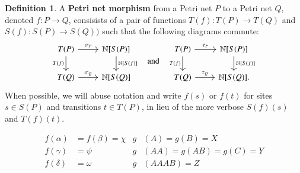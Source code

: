 \documentclass[aps,prd,onecolumn,nofootinbib,letterpaper,preprintnumbers,superscriptaddress,eqsecnum]{revtex4}
\theoremstyle{definition}
\newtheorem{definition}{Definition}
\newcommand{\N}{\mathbb{N}}
\begin{document}
\begin{definition}\label{def:petri-map}
    A \textbf{Petri net morphism} from a Petri net $P$ to a Petri net $Q$, denoted $f : P \rightarrow Q$, consisists of a pair of functions $T(f) : T(P) \rightarrow T(Q)$ and $S(f): S(P) \rightarrow S(Q))$ such that the following diagrams commute:
    \begin{equation*}
        \begin{tikzcd}
            T(P)
            \arrow[r, "\sigma_P"]
            \arrow[d, "T(f)", swap]
            &
            \N[S(P)]
            \arrow[d, "\N \lbrack S(f) \rbrack"]
            \\
            T(Q)
            \arrow[r, "\sigma_Q"]
            &
            \N[S(Q)]
        \end{tikzcd}
        \quad
        \textrm{and}
        \quad
        \begin{tikzcd}
            T(P)
            \arrow[r, "\tau_P"]
            \arrow[d, "T(f)", swap]
            &
            \N[S(P)]
            \arrow[d, "\N \lbrack S(f) \rbrack"]
            \\
            T(Q)
            \arrow[r, "\tau_Q"]
            &
            \N[S(Q)].
        \end{tikzcd}
    \end{equation*}
    When possible, we will abuse notation and write $f(s)$ or $f(t)$ for sites $s \in S(P)$ and transitions $t \in T(P)$, in lieu of the more verbose $S(f)(s)$ and $T(f)(t)$.
\end{definition}

\begin{align*}
    f(\alpha) &= f(\beta) = \chi    & g&(A)    = g(B) = X \\
    f(\gamma) &= \psi               & g&(AA)   = g(AB) = g(C) = Y \\
    f(\delta) &= \omega             & g&(AAAB) = Z
\end{align*}
\end{document}
